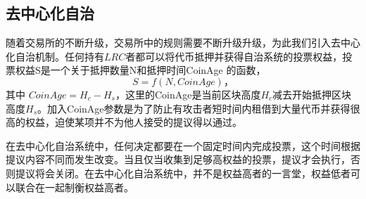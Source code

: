 \documentclass[UTF8,nofonts]{ctexart}
\begin{document}
\subsection{去中心化自治}
随着交易所的不断升级，交易所中的规则需要不断升级升级，为此我们引入去中心化自治机制。任何持有$LRC$者都可以将代币抵押并获得自治系统的投票权益，投票权益S是一个关于抵押数量N和抵押时间CoinAge 的函数，
$$S = f(N, CoinAge)\text{，}$$
其中 $CoinAge = H_{c}-H_{s}$，这里的CoinAge是当前区块高度$H_{c}$减去开始抵押区块高度$H_{s}$。加入CoinAge参数是为了防止有攻击者短时间内租借到大量代币并获得很高的权益，迫使某项并不为他人接受的提议得以通过。

在去中心化自治系统中，任何决定都要在一个固定时间内完成投票，这个时间根据提议内容不同而发生改变。当且仅当收集到足够高权益的投票，提议才会执行，否则提议将会关闭。在去中心化自治系统中，并不是权益高者的一言堂，权益低者可以联合在一起制衡权益高者。
\end{document}
